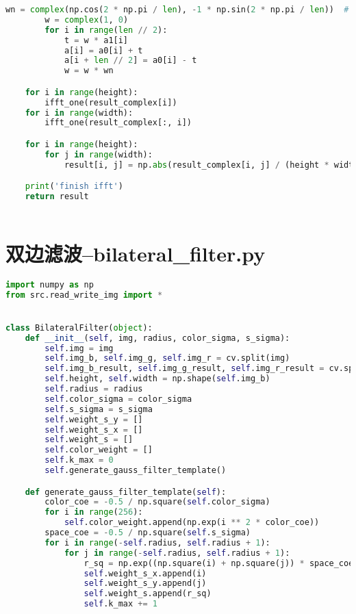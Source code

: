 \documentclass{hitreport}
\begin{document}
\begin{appendices}
\begin{lstlisting}[language=python]
        wn = complex(np.cos(2 * np.pi / len), -1 * np.sin(2 * np.pi / len))  # 参数
        w = complex(1, 0)
        for i in range(len // 2):
            t = w * a1[i]
            a[i] = a0[i] + t
            a[i + len // 2] = a0[i] - t
            w = w * wn

    for i in range(height):
        ifft_one(result_complex[i])
    for i in range(width):
        ifft_one(result_complex[:, i])

    for i in range(height):
        for j in range(width):
            result[i, j] = np.abs(result_complex[i, j] / (height * width))

    print('finish ifft')
    return result



\end{lstlisting}

\section{双边滤波--bilateral\_filter.py}
\begin{lstlisting}[language=python]
import numpy as np
from src.read_write_img import *


class BilateralFilter(object):
    def __init__(self, img, radius, color_sigma, s_sigma):
        self.img = img
        self.img_b, self.img_g, self.img_r = cv.split(img)
        self.img_b_result, self.img_g_result, self.img_r_result = cv.split(img)
        self.height, self.width = np.shape(self.img_b)
        self.radius = radius
        self.color_sigma = color_sigma
        self.s_sigma = s_sigma
        self.weight_s_y = []
        self.weight_s_x = []
        self.weight_s = []
        self.color_weight = []
        self.k_max = 0
        self.generate_gauss_filter_template()

    def generate_gauss_filter_template(self):
        color_coe = -0.5 / np.square(self.color_sigma)
        for i in range(256):
            self.color_weight.append(np.exp(i ** 2 * color_coe))
        space_coe = -0.5 / np.square(self.s_sigma)
        for i in range(-self.radius, self.radius + 1):
            for j in range(-self.radius, self.radius + 1):
                r_sq = np.exp((np.square(i) + np.square(j)) * space_coe)
                self.weight_s_x.append(i)
                self.weight_s_y.append(j)
                self.weight_s.append(r_sq)
                self.k_max += 1


\end{lstlisting}
\end{appendices}
\end{document}
